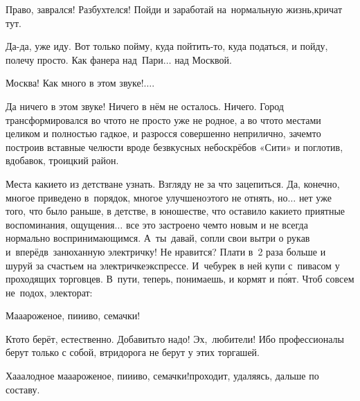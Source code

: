 \diagdash Право, заврался! Разбухтелся! Пойди и заработай на~нормальную жизнь,\mdash кричат
тут.

Да-да, уже иду. Вот только пойму, куда пойтить-то, куда податься, и пойду, полечу просто. Как фанера над~Пари$\ldots$ над Москвой. 

\diagdash Москва! Как много в этом звуке!$\ldots$. 

Да ничего в этом звуке! Ничего в нём не осталось. Ни\sdash че\sdash го. Город трансформировался во что\sdash то не просто уже не родное, а во что\sdash то местами целиком и полностью гадкое, и разросся совершенно неприлично, зачем\sdash то построив вставные челюсти вроде безвкусных небоскрёбов «Сити» и поглотив, вдобавок, троицкий район. 

Места какие\sdash то из детства\mdash не узнать. Взгляду не за что зацепиться. Да, конечно, многое приведено в~порядок, многое улучшено\mdash этого не отнять, но$\ldots$ нет уже того, что было раньше, в детстве, в юношестве, что оставило какие\sdash то приятные воспоминания, ощущения$\ldots$ все это застроено чем\sdash то новым и не всегда нормально воспринимающимся.
А~ты~давай, сопли свои вытри о рукав и~вперёд\mdash в~занюханную электричку! Не нравится? Плати в~2 раза больше и шуруй за счастьем на электричке\sdash экспрессе. И~чебурек в ней купи с~пивасом у проходящих торговцев. В~пути, теперь, понимаешь, и кормят и п\'{о}ят. Чтоб совсем не~подох, электорат:

\diagdash Ма\sdash а\sdash ароженое, пи\sdash и\sdash иво, семачки!

Кто\sdash то берёт, естественно. Добавить\sdash то надо! Эх,~любители! Ибо профессионалы берут только с собой, втридорога не берут у этих торгашей.

\diagdash Ха\sdash а\sdash алодное ма\sdash а\sdash ароженое, пи\sdash и\sdash иво, семачки!\mdash проходит, удаляясь, дальше по составу.

